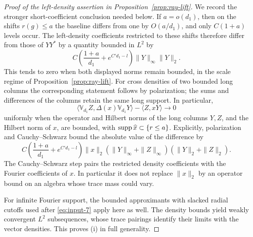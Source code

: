 \begin{proof}[Proof of the left-density assertion in
Proposition~\ref{prop:ray-lift}]
We record the stronger short-coefficient conclusion needed below.
If \(a=o({d_1})\), then on the shifts \(r(g)\le a\) the baseline
differs from one by \(O(a/{d_1})\), and only \(C(1+a)\) levels occur.
The left-density coefficients restricted to these shifts therefore
differ from those of \(YY^*\) by a quantity bounded in \(L^2\) by
\begin{equation}\label{eq:ray-short-density}
 C\left(\frac{1+a}{d_1}+e^{C'{d_1}-l}\right)
                        \|Y\|_\infty\|Y\|_2.
\end{equation}
This tends to zero when both displayed norms remain bounded, in the
scale regime of Proposition~\ref{prop:ray-lift}.
For cross densities of two bounded long columns the corresponding
statement follows by polarization; the sums and differences of
the columns retain the same long support.  In particular,
\begin{equation}\label{eq:ray-left-pairing}
 \langle\mathbb V_{d_1}Z,\Delta(x)\mathbb V_{d_1}Y\rangle
                               -\langle Z,xY\rangle\longrightarrow0
\end{equation}
uniformly when the operator and Hilbert norms of the long columns
\(Y,Z\), and the Hilbert norm of \(x\), are bounded, with
\(\operatorname{supp}\widehat x\subset\{r\le a\}\).  Explicitly, polarization
and Cauchy--Schwarz bound the absolute value of the difference by
\[
 C\left(\frac{1+a}{d_1}+e^{C'd_1-l}\right)\|x\|_2
   (\|Y\|_\infty+\|Z\|_\infty)(\|Y\|_2+\|Z\|_2).
\]
The Cauchy--Schwarz step pairs the restricted density coefficients
with the Fourier coefficients of \(x\).  In particular it does not
replace \(\|x\|_2\) by an operator bound on an algebra whose trace
mass could vary.

For infinite Fourier support, the bounded approximants with slacked
radial cutoffs used after \eqref{eq:input-7} apply here as well.
The density bounds yield weakly convergent \(L^2\) subsequences,
whose trace pairings identify their limits with the vector densities.
This proves (i) in full generality.
\end{proof}

